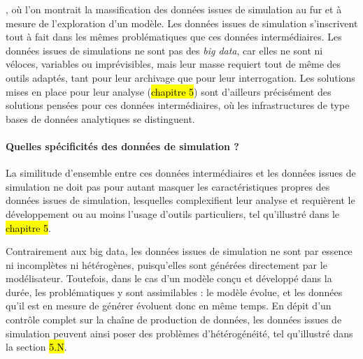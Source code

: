 {	%
}, où l'on montrait la massification des données issues de simulation au fur et à mesure de l'exploration d'un modèle.
Les données issues de simulation s'inscrivent tout à fait dans les mêmes problématiques que ces \og données intermédiaires\fg{}.
Les données issues de simulations ne sont pas des \textit{big data}, car elles ne sont ni véloces, variables ou imprévisibles, mais leur masse requiert tout de même des outils adaptés, tant pour leur archivage que pour leur interrogation.
Les solutions mises en place pour leur analyse (\hl{chapitre 5}) sont d'ailleurs précisément des solutions pensées pour ces données intermédiaires, où les infrastructures de type \og bases de données analytiques\fg{} se distinguent.

\paragraph{Quelles spécificités des données de simulation ?}\label{par:specificites-donnees-simul}
La similitude d'ensemble entre ces données intermédiaires et les données issues de simulation ne doit pas pour autant masquer les caractéristiques propres des données issues de simulation, lesquelles complexifient leur analyse et requièrent le développement ou au moins l'usage d'outils particuliers, tel qu'illustré dans le \hl{chapitre 5}.

\noindent Contrairement aux big data, les données issues de simulation ne sont par essence ni incomplètes ni hétérogènes, puisqu'elles sont générées directement par le modélisateur.
Toutefois, dans le cas d'un modèle conçu et développé dans la durée, les problématiques y sont assimilables : le modèle évolue, et les données qu'il est en mesure de générer évoluent donc en même temps.
En dépit d'un contrôle complet sur la chaîne de production de données, les données issues de simulation peuvent ainsi poser des problèmes d'hétérogénéité, tel qu'illustré dans la section \hl{5.N}.

